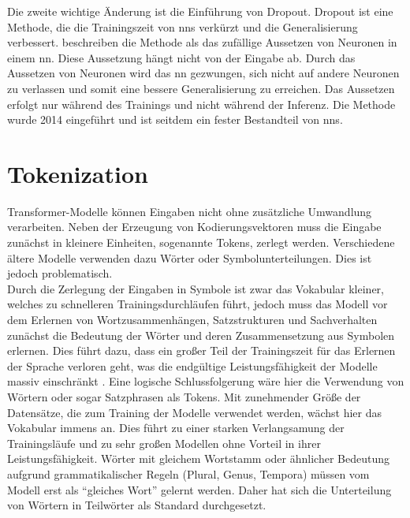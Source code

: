 Die zweite wichtige Änderung ist die Einführung von Dropout. 
Dropout ist eine Methode, die die Trainingszeit von \ac{nn}s verkürzt und die Generalisierung verbessert. 
\citet{dropout} beschreiben die Methode als das zufällige Aussetzen von Neuronen in einem \ac{nn}. 
Diese Aussetzung hängt nicht von der Eingabe ab. 
Durch das Aussetzen von Neuronen wird das \ac{nn} gezwungen, sich nicht auf andere Neuronen zu verlassen und somit eine bessere Generalisierung zu erreichen. 
Das Aussetzen erfolgt nur während des Trainings und nicht während der Inferenz. 
Die Methode wurde 2014 eingeführt und ist seitdem ein fester Bestandteil von \ac{nn}s.\\

\section{Tokenization}\label{sec:tokenization}
Transformer-Modelle können Eingaben nicht ohne zusätzliche Umwandlung verarbeiten.
Neben der Erzeugung von Kodierungsvektoren muss die Eingabe zunächst in kleinere Einheiten, sogenannte Tokens, zerlegt werden.
Verschiedene ältere Modelle verwenden dazu Wörter oder Symbolunterteilungen.
Dies ist jedoch problematisch.\\

Durch die Zerlegung der Eingaben in Symbole ist zwar das Vokabular kleiner, welches zu schnelleren Trainingsdurchläufen führt, jedoch muss das Modell vor dem Erlernen von Wortzusammenhängen, Satzstrukturen und Sachverhalten zunächst die Bedeutung der Wörter und deren Zusammensetzung aus Symbolen erlernen.
Dies führt dazu, dass ein großer Teil der Trainingszeit für das Erlernen der Sprache verloren geht, was die endgültige Leistungsfähigkeit der Modelle massiv einschränkt \citep{bpe}.
Eine logische Schlussfolgerung wäre hier die Verwendung von Wörtern oder sogar Satzphrasen als Tokens.
Mit zunehmender Größe der Datensätze, die zum Training der Modelle verwendet werden, wächst hier das Vokabular immens an.
Dies führt zu einer starken Verlangsamung der Trainingsläufe und zu sehr großen Modellen ohne Vorteil in ihrer Leistungsfähigkeit.
Wörter mit gleichem Wortstamm oder ähnlicher Bedeutung aufgrund grammatikalischer Regeln (Plural, Genus, Tempora) müssen vom Modell erst als \enquote{gleiches Wort} gelernt werden.
Daher hat sich die Unterteilung von Wörtern in Teilwörter als Standard durchgesetzt.

